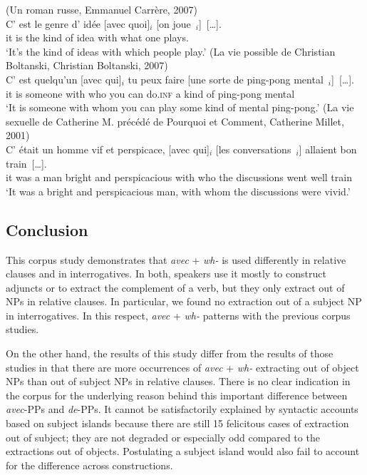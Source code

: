 \eal
\ex (Un roman russe, Emmanuel Carrère, 2007)\\
\gll C' est le genre d' idée [avec quoi]$_i$ [on joue~\trace{}$_i$]~[\dots].\\
it is the kind of idea with what one plays.\\
\glt `It's the kind of ideas with which people play.'
\label{ex:avecq-cleft-verb}
\ex (La vie possible de Christian Boltanski, Christian Boltanski, 2007)\nopagebreak\\
\gll C' est quelqu'un	[avec qui]$_i$ tu peux faire [une sorte de ping-pong mental~\trace{}$_i$]~[\dots].\\
it is someone with who you can do\textsc{.inf} a kind of ping-pong mental\\
\glt `It is someone with whom you can play some kind of mental ping-pong.'
\label{ex:avecq-cleft-object}
\ex (La vie sexuelle de Catherine M. précédé de Pourquoi et Comment, Catherine Millet, 2001)\\
\gll C' était un homme vif et perspicace, [avec qui]$_i$ [les conversations~\trace{}$_i$] allaient bon train~[\dots].\\
it was a man bright and perspicacious with who the discussions went well train\\
\glt `It was a bright and perspicacious man, with whom the discussions were vivid.'
\label{ex:avecq-cleft-subject}
\zl 

\subsection{Conclusion}

This corpus study demonstrates that \emph{avec} + \emph{wh-} is used differently in relative clauses and in interrogatives. In both, speakers use it mostly to construct adjuncts or to extract the complement of a verb, but they only extract out of NPs in relative clauses. In particular, we found no extraction out of a subject NP in interrogatives. In this respect, \emph{avec} + \emph{wh-} patterns with the previous corpus studies.

On the other hand, the results of this study differ from the results of those studies in that there are more occurrences of \emph{avec} + \emph{wh-} extracting out of object NPs than out of subject NPs in relative clauses. There is no clear indication in the corpus for the underlying reason behind this important difference between \emph{avec}-PPs and \emph{de}-PPs. It cannot be satisfactorily explained by syntactic accounts based on subject islands because there are still 15 felicitous cases of extraction out of subject; they are not degraded or especially odd compared to the extractions out of objects. Postulating a subject island would also fail to account for the difference across constructions. 

